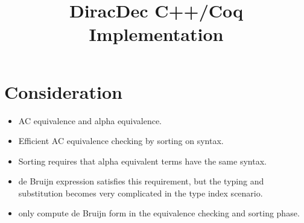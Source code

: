 \documentclass{article}
\title{\textbf{DiracDec C++/Coq Implementation\cite{ExampleCitation}}}
\begin{document}
\maketitle


\newcommand{\reduce}{\triangleright}

\newcommand{\Sort}{\mathsf{Sort}}
\newcommand{\WF}{\mathcal{WF}}

\newcommand{\Index}{\mathsf{Index}}
\newcommand{\Type}{\mathsf{Type}}
\newcommand{\Basis}{\mathsf{Basis}}

\newcommand{\SType}{\mathcal{S}}
\newcommand{\KType}{\mathcal{K}}
\newcommand{\BType}{\mathcal{B}}
\newcommand{\OType}{\mathcal{O}}
\newcommand{\SET}{\mathsf{Set}}

\newcommand{\ZEROK}{\mathbf{0}_\mathcal{K}}
\newcommand{\ZEROB}{\mathbf{0}_\mathcal{B}}
\newcommand{\ZEROO}{\mathbf{0}_\mathcal{O}}

\newcommand{\PAIR}{\mathsf{PAIR}}

\newcommand{\ZERO}{\mathsf{0}}
\newcommand{\ONE}{\mathsf{1}}
\newcommand{\ADDS}{\mathsf{ADDS}}
\newcommand{\ADD}{\mathsf{ADD}}
\newcommand{\MULS}{\mathsf{MULS}}
\newcommand{\MUL}{\mathsf{MUL}}
\newcommand{\CONJ}{\mathsf{CONJ}}
\newcommand{\CJG}{\mathsf{CJG}}
\newcommand{\ADJ}{\mathsf{ADJ}}
\newcommand{\DELTA}{\mathsf{DELTA}}
\newcommand{\DOT}{\mathsf{DOT}}
\newcommand{\SCR}{\mathsf{SCR}}
\newcommand{\TSR}{\mathsf{TSR}}
\newcommand{\KET}{\mathsf{KET}}
\newcommand{\BRA}{\mathsf{BRA}}
\newcommand{\ONEO}{\mathbf{1}_\mathcal{O}}
\newcommand{\OUTER}{\mathsf{OUTER}}
\newcommand{\MULK}{\mathsf{MULK}}
\newcommand{\MULB}{\mathsf{MULB}}
\newcommand{\MULO}{\mathsf{MULO}}


\section{Consideration}
\begin{itemize}
    \item AC equivalence and alpha equivalence.
    \item Efficient AC equivalence checking by sorting on syntax.
    \item Sorting requires that alpha equivalent terms have the same syntax.
    \item de Bruijn expression satisfies this requirement, but the typing and substitution becomes very complicated in the type index scenario.
    \item only compute de Bruijn form in the equivalence checking and sorting phase.
\end{itemize}
\end{document}
